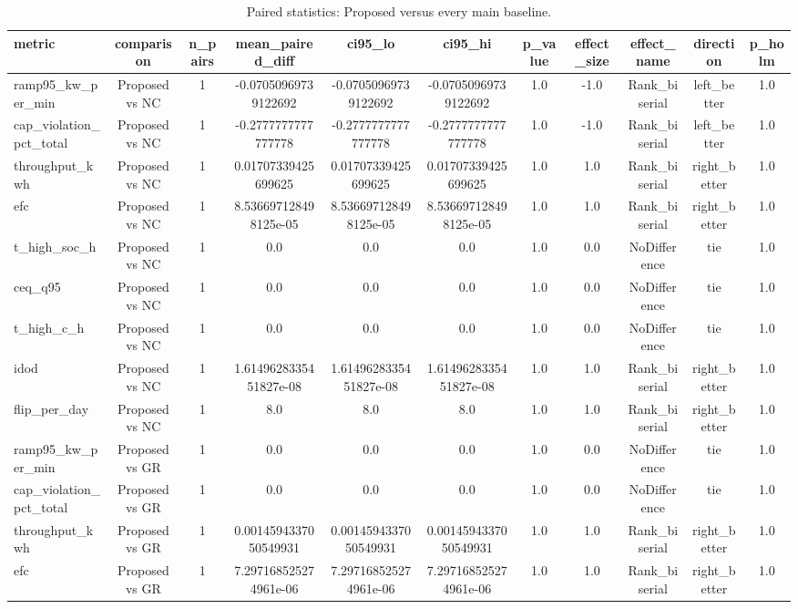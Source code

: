 \begin{table}[t]
\centering
\caption{Paired statistics: Proposed versus every main baseline.}
\label{tab:stats_all_auto}
\begin{tabular}{lcccccccccc}
\toprule
metric & comparison & n\_pairs & mean\_paired\_diff & ci95\_lo & ci95\_hi & p\_value & effect\_size & effect\_name & direction & p\_holm \\
\midrule
ramp95\_kw\_per\_min & Proposed vs NC & 1 & -0.07050969739122692 & -0.07050969739122692 & -0.07050969739122692 & 1.0 & -1.0 & Rank\_biserial & left\_better & 1.0 \\
cap\_violation\_pct\_total & Proposed vs NC & 1 & -0.2777777777777778 & -0.2777777777777778 & -0.2777777777777778 & 1.0 & -1.0 & Rank\_biserial & left\_better & 1.0 \\
throughput\_kwh & Proposed vs NC & 1 & 0.01707339425699625 & 0.01707339425699625 & 0.01707339425699625 & 1.0 & 1.0 & Rank\_biserial & right\_better & 1.0 \\
efc & Proposed vs NC & 1 & 8.536697128498125e-05 & 8.536697128498125e-05 & 8.536697128498125e-05 & 1.0 & 1.0 & Rank\_biserial & right\_better & 1.0 \\
t\_high\_soc\_h & Proposed vs NC & 1 & 0.0 & 0.0 & 0.0 & 1.0 & 0.0 & NoDifference & tie & 1.0 \\
ceq\_q95 & Proposed vs NC & 1 & 0.0 & 0.0 & 0.0 & 1.0 & 0.0 & NoDifference & tie & 1.0 \\
t\_high\_c\_h & Proposed vs NC & 1 & 0.0 & 0.0 & 0.0 & 1.0 & 0.0 & NoDifference & tie & 1.0 \\
idod & Proposed vs NC & 1 & 1.6149628335451827e-08 & 1.6149628335451827e-08 & 1.6149628335451827e-08 & 1.0 & 1.0 & Rank\_biserial & right\_better & 1.0 \\
flip\_per\_day & Proposed vs NC & 1 & 8.0 & 8.0 & 8.0 & 1.0 & 1.0 & Rank\_biserial & right\_better & 1.0 \\
ramp95\_kw\_per\_min & Proposed vs GR & 1 & 0.0 & 0.0 & 0.0 & 1.0 & 0.0 & NoDifference & tie & 1.0 \\
cap\_violation\_pct\_total & Proposed vs GR & 1 & 0.0 & 0.0 & 0.0 & 1.0 & 0.0 & NoDifference & tie & 1.0 \\
throughput\_kwh & Proposed vs GR & 1 & 0.0014594337050549931 & 0.0014594337050549931 & 0.0014594337050549931 & 1.0 & 1.0 & Rank\_biserial & right\_better & 1.0 \\
efc & Proposed vs GR & 1 & 7.297168525274961e-06 & 7.297168525274961e-06 & 7.297168525274961e-06 & 1.0 & 1.0 & Rank\_biserial & right\_better & 1.0 \\

\end{tabular}
\end{table}
